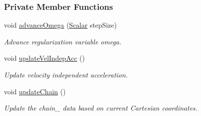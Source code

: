 \subsubsection*{Private Member Functions}
\begin{DoxyCompactItemize}
\item 
void \mbox{\hyperlink{class_a_rchain_3_01_newtonian_3_01typename_01_evolved_data_1_1_scalar_01_4_00_01_evolved_data_00_01_regularitor_01_4_a8427d55e9b05fca4a1db2b9024940e06}{advance\+Omega}} (\mbox{\hyperlink{class_a_rchain_3_01_newtonian_3_01typename_01_evolved_data_1_1_scalar_01_4_00_01_evolved_data_00_01_regularitor_01_4_a2c77dc1b58a25ac5c6ee95dd7809f693}{Scalar}} step\+Size)
\begin{DoxyCompactList}\small\item\em Advance regularization variable omega. \end{DoxyCompactList}\item 
void \mbox{\hyperlink{class_a_rchain_3_01_newtonian_3_01typename_01_evolved_data_1_1_scalar_01_4_00_01_evolved_data_00_01_regularitor_01_4_a2b11ca856564416ed6727c716ed284a8}{update\+Vel\+Indep\+Acc}} ()
\begin{DoxyCompactList}\small\item\em Update velocity independent acceleration. \end{DoxyCompactList}\item 
void \mbox{\hyperlink{class_a_rchain_3_01_newtonian_3_01typename_01_evolved_data_1_1_scalar_01_4_00_01_evolved_data_00_01_regularitor_01_4_acbe31e9aa918e4f80a2763e16f0bb7bc}{update\+Chain}} ()
\begin{DoxyCompactList}\small\item\em Update the chain_ data based on current Cartesian coordinates. \end{DoxyCompactList}\end{DoxyCompactItemize}

